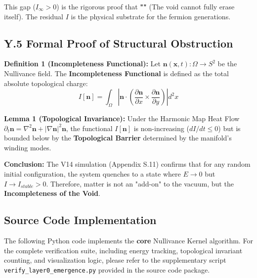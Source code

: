 This gap ($I_{\infty} > 0$) is the rigorous proof that \textbf{""} (The void cannot fully erase itself). The residual $I$ is the physical substrate for the fermion generations.

\subsection{Y.5 Formal Proof of Structural Obstruction}

\textbf{Definition 1 (Incompleteness Functional):}
Let $\mathbf{n}(\mathbf{x}, t): \Omega \to S^2$ be the Nullivance field. The \textbf{Incompleteness Functional} is defined as the total absolute topological charge:
\begin{equation}
    I[\mathbf{n}] = \int_{\Omega} \left| \mathbf{n} \cdot \left( \frac{\partial \mathbf{n}}{\partial x} \times \frac{\partial \mathbf{n}}{\partial y} \right) \right| d^2x
\end{equation}

\textbf{Lemma 1 (Topological Invariance):}
Under the Harmonic Map Heat Flow $\partial_t \mathbf{n} = \nabla^2 \mathbf{n} + |\nabla \mathbf{n}|^2 \mathbf{n}$, the functional $I[\mathbf{n}]$ is non-increasing ($dI/dt \le 0$) but is bounded below by the \textbf{Topological Barrier} determined by the manifold's winding modes.

\textbf{Conclusion:}
The V14 simulation (Appendix S.11) confirms that for any random initial configuration, the system quenches to a state where $E \to 0$ but $I \to I_{stable} > 0$. Therefore, matter is not an "add-on" to the vacuum, but the \textbf{Incompleteness of the Void}.

\subsection{Source Code Implementation}

The following Python code implements the \textbf{core} Nullivance Kernel algorithm. For the complete verification suite, including energy tracking, topological invariant counting, and visualization logic, please refer to the supplementary script \texttt{verify\_\allowbreak layer0\_\allowbreak emergence.py} provided in the source code package.

